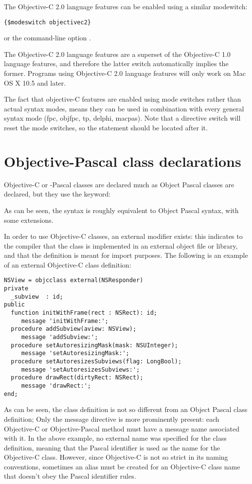 The Objective-C 2.0 language features can be enabled using a similar
modewitch:
\begin{verbatim}
{$modeswitch objectivec2}
\end{verbatim}
or the command-line option .

The Objective-C 2.0 language features are a superset of the Objective-C 1.0
language features, and therefore the latter switch automatically implies the
former. Programs using Objective-C 2.0 language features will only work on
Mac OS X 10.5 and later.

The fact that objective-C features are enabled using mode switches rather than 
actual syntax modes, means they can be used in combination with every general 
syntax mode (fpc, objfpc, tp, delphi, macpas). Note that a 
directive switch will reset the mode switches, so the 
statement should be located after it.

\section{Objective-Pascal class declarations}
Objective-C or -Pascal classes are declared much as Object Pascal classes are
declared, but they use the  keyword:

As can be seen, the syntax is roughly equivalent to Object Pascal syntax, with some
extensions.

In order to use Objective-C classes, an external modifier exists: this
indicates to the compiler that the class is implemented in an external object
file or library, and that the definition is meant for import purposes.
The following is an example of an external Objective-C class definition:
\begin{verbatim}
NSView = objcclass external(NSResponder)
private
  _subview  : id; 
public
  function initWithFrame(rect : NSRect): id; 
     message 'initWithFrame:';
  procedure addSubview(aview: NSView); 
     message 'addSubview:';
  procedure setAutoresizingMask(mask: NSUInteger); 
     message 'setAutoresizingMask:';
  procedure setAutoresizesSubviews(flag: LongBool); 
     message 'setAutoresizesSubviews:';
  procedure drawRect(dirtyRect: NSRect); 
     message 'drawRect:';
end;
\end{verbatim}
As can be seen, the class definition is not so different from an Object
Pascal class definition; Only the message directive is more prominently
present: each Objective-C or Objective-Pascal method must have a message
name associated with it. In the above example, no external name was 
specified for the class definition, meaning that the Pascal identifier is
used as the name for the Objective-C class. However, since Objective-C is not so
strict in its naming conventions, sometimes an alias must be created for an
Objective-C class name that doesn't obey the Pascal identifier rules. 

